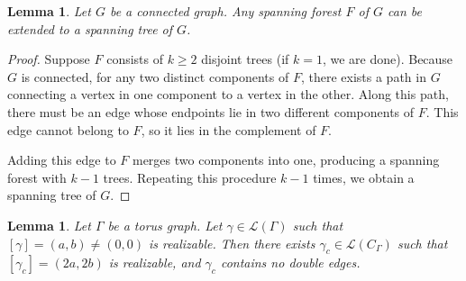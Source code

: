 \documentclass[12pt,a4paper]{article}
\newtheorem{lem}[thm]{Lemma}
\theoremstyle{definition}
\begin{document}
\begin{lem} \label{sp forest to span tree}
    Let $G$ be a connected graph. Any spanning forest $F$ of $G$ can be extended to a spanning tree of $G$.
\end{lem}

\begin{proof}
    Suppose $F$ consists of $k \ge 2$ disjoint trees (if $k = 1$, we are done). Because $G$ is connected, for any two distinct components of $F$, there exists a path in $G$ connecting a vertex in one component to a vertex in the other. Along this path, there must be an edge whose endpoints lie in two different components of $F$. This edge cannot belong to $F$, so it lies in the complement of $F$.

    Adding this edge to $F$ merges two components into one, producing a spanning forest with $k-1$ trees. Repeating this procedure $k-1$ times, we obtain a spanning tree of $G$.
\end{proof}

\begin{lem} \label{loops without double edges on corner graphs}
    Let $\Gamma$ be a torus graph. Let $\gamma \in \mathcal{L}(\Gamma)$ such that $[\gamma] = (a,b) \neq (0,0)$ is realizable. Then there exists $\gamma_c \in \mathcal{L}(C_\Gamma)$ such that $[\gamma_c] = (2a, 2b)$ is realizable, and $\gamma_c$ contains no double edges.
\end{lem}
\end{document}
